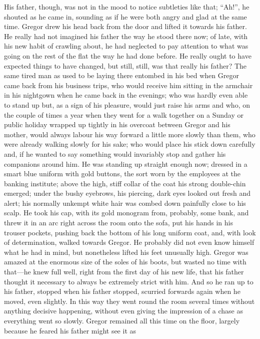 His father, though, was not in the mood to notice subtleties like that;
“Ah!”, he shouted as he came in, sounding as if he were both angry and
glad at the same time. Gregor drew his head back from the door and
lifted it towards his father. He really had not imagined his father the
way he stood there now; of late, with his new habit of crawling about,
he had neglected to pay attention to what was going on the rest of the
flat the way he had done before. He really ought to have expected
things to have changed, but still, still, was that really his father?
The same tired man as used to be laying there entombed in his bed when
Gregor came back from his business trips, who would receive him sitting
in the armchair in his nightgown when he came back in the evenings; who
was hardly even able to stand up but, as a sign of his pleasure, would
just raise his arms and who, on the couple of times a year when they
went for a walk together on a Sunday or public holiday wrapped up
tightly in his overcoat between Gregor and his mother, would always
labour his way forward a little more slowly than them, who were already
walking slowly for his sake; who would place his stick down carefully
and, if he wanted to say something would invariably stop and gather his
companions around him. He was standing up straight enough now; dressed
in a smart blue uniform with gold buttons, the sort worn by the
employees at the banking institute; above the high, stiff collar of the
coat his strong double-chin emerged; under the bushy eyebrows, his
piercing, dark eyes looked out fresh and alert; his normally unkempt
white hair was combed down painfully close to his scalp. He took his
cap, with its gold monogram from, probably, some bank, and threw it in
an arc right across the room onto the sofa, put his hands in his
trouser pockets, pushing back the bottom of his long uniform coat, and,
with look of determination, walked towards Gregor. He probably did not
even know himself what he had in mind, but nonetheless lifted his feet
unusually high. Gregor was amazed at the enormous size of the soles of
his boots, but wasted no time with that—he knew full well, right from
the first day of his new life, that his father thought it necessary to
always be extremely strict with him. And so he ran up to his father,
stopped when his father stopped, scurried forwards again when he moved,
even slightly. In this way they went round the room several times
without anything decisive happening, without even giving the impression
of a chase as everything went so slowly. Gregor remained all this time
on the floor, largely because he feared his father might see it as
